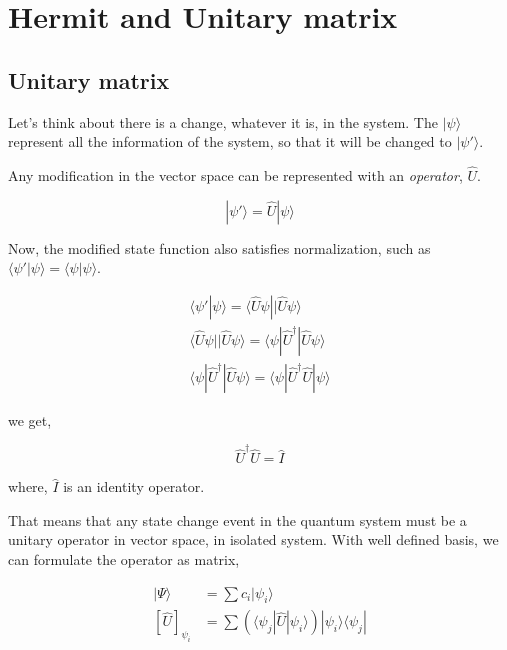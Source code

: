 \chapter{Hermit and Unitary matrix}
\label{appendix_chap:hermit_uni}
\section{Unitary matrix}

Let's think about there is a change, whatever it is, in the system.
The $| \psi \rangle$ represent all the information of the system, so that it will be changed to $| \psi' \rangle$. 

Any modification in the vector space can be represented with an \textit{operator}, $\hat{U}$.

\begin{equation}
    |\psi' \rangle = \hat{U} | \psi \rangle
\end{equation}

Now, the modified state function also satisfies normalization, such as $\langle \psi' | \psi \rangle = \langle \psi | \psi \rangle$.

\begin{eqnarray*}
    \langle \psi' | \psi \rangle = \langle \hat{U} \psi | |\hat{U} \psi \rangle \\ 
    \langle \hat{U} \psi | |\hat{U} \psi \rangle = \langle  \psi| \hat{U}^{\dagger}|\hat{U} \psi \rangle\\
    \langle \psi| \hat{U}^{\dagger}|\hat{U} \psi \rangle = \langle \psi| \hat{U}^{\dagger}\hat{U}| \psi \rangle
\end{eqnarray*}

we get,

\begin{equation}
    \label{eq:unitary}
    \hat{U}^\dagger \hat{U} = \hat{I}
\end{equation}

where, $\hat{I}$ is an identity operator. 

That means that any state change event in the quantum system must be a unitary operator in vector space, in isolated system.
With well defined basis, we can formulate the operator as matrix, 

\begin{eqnarray*}
    {|\Psi \rangle} &= {\sum c_i |\psi_i \rangle} \\
    {[\hat{U}]}_{\psi_i} &= \sum (\langle \psi_j | \hat{U} |\psi_i \rangle) |\psi_i \rangle \langle \psi_j|
\end{eqnarray*}

